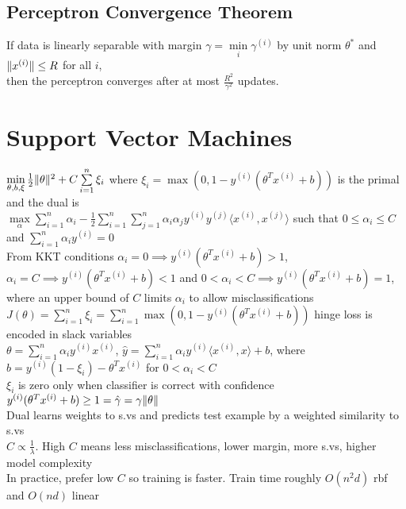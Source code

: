 \documentclass{article}
\newcommand\inner[2]{\langle #1, #2 \rangle}
\DeclarePairedDelimiter\norm{\lVert}{\rVert}
\begin{document}
\subsection{Perceptron Convergence Theorem}
If data is linearly separable with margin $\gamma = \min\limits_i \gamma^{(i)}$ by unit norm $\theta^*$ and $\norm {x^{(i)}} \leq R$ for all $i$, \\ then the perceptron converges after at most $\frac{R^2}{\gamma^2}$ updates.

\section{Support Vector Machines}
$\min\limits_{\theta, b, \xi} \frac{1}{2} \norm{\theta} ^2 + C\sum\limits_{i=1}^n\xi_i$ where $\xi_i = \max(0, 1-y^{(i)}(\theta^Tx^{(i)} + b))$ is the primal and the dual is \\
$\max\limits_\alpha \sum\limits_{i=1}^n \alpha_i - \frac{1}{2}\sum\limits_{i=1}^n\sum\limits_{j=1}^n \alpha_i \alpha_j y^{(i)}y^{(j)}\inner{x^{(i)}}{x^{(j)}}$ such that $0 \leq \alpha_i \leq C$ and $\sum\limits_{i=1}^n \alpha_i y^{(i)} = 0$ \\
From KKT conditions $\alpha_i = 0 \implies y^{(i)}(\theta^Tx^{(i)} + b) > 1$, $\alpha_i = C \implies y^{(i)}(\theta^Tx^{(i)} + b) < 1$ and $0 < \alpha_i < C \implies y^{(i)}(\theta^Tx^{(i)} + b) = 1$, where an upper bound of $C$ limits $\alpha_i$ to allow misclassifications \\
$J(\theta) = \sum\limits_{i=1}^n \xi_i = \sum\limits_{i=1}^n \max(0, 1-y^{(i)}(\theta^Tx^{(i)} + b))$ hinge loss is encoded in slack variables \\
$\theta = \sum\limits_{i=1}^n \alpha_i y^{(i)}x^{(i)}$, $\hat y = \sum\limits_{i=1}^n \alpha_i y^{(i)} \inner{x^{(i)}}{x} + b$, where $b = y^{(i)}(1 - \xi_i) - \theta^T x^{(i)}$ for $0 < \alpha_i < C$ \\
$\xi_i$ is zero only when classifier is correct with confidence $y^{(i)}(\theta^Tx^{(i)} + b) \geq 1 = \hat \gamma = \gamma \norm \theta$ \\
Dual learns weights to s.vs and predicts test example by a weighted similarity to s.vs \\
$C \propto \frac{1}{\lambda}$. High $C$ means less misclassifications, lower margin, more s.vs, higher model complexity \\
In practice, prefer low $C$ so training is faster. Train time roughly $O(n^2d)$ rbf and $O(nd)$ linear
\end{document}

